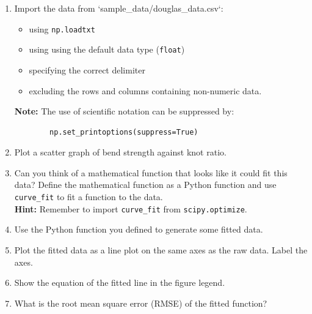 \documentclass[11pt]{report}
\begin{document}
\begin{enumerate}[label=(\Alph*)]
    \item Import the data from `sample\_data/douglas\_data.csv`:
    \begin{itemize}
        \item using {\tt np.loadtxt}
        \item using using the default data type ({\tt float})
        \item specifying the correct delimiter
        \item excluding the rows and columns containing non-numeric data.
    \end{itemize}
    {\bf Note:} The use of scientific notation can be suppressed by:
    \begin{verbatim}
        np.set_printoptions(suppress=True)
    \end{verbatim}
    
    \item Plot a scatter graph of bend strength against knot ratio. 
    \item Can you think of a mathematical function that looks like it could fit this data? Define the mathematical function as a Python function and use {\tt curve\_fit} to fit a function to the data.\\  {\bf Hint:} Remember to import {\tt curve\_fit} from {\tt scipy.optimize}.  
    \item Use the Python function you defined to generate some fitted data. 
    \item Plot the fitted data as a line plot on the same axes as the raw data. Label the axes.
    \item Show the equation of the fitted line in the figure legend.
    \item What is the root mean square error (RMSE) of the fitted function? 
\end{enumerate}
\end{document}
